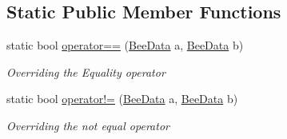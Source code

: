\subsection*{Static Public Member Functions}
\begin{DoxyCompactItemize}
\item 
static bool \hyperlink{struct_bee_game_1_1_bee_1_1_bee_data_aafcbf3edbd35377ba1ed6bd1597427f2}{operator==} (\hyperlink{struct_bee_game_1_1_bee_1_1_bee_data}{Bee\+Data} a, \hyperlink{struct_bee_game_1_1_bee_1_1_bee_data}{Bee\+Data} b)
\begin{DoxyCompactList}\small\item\em Overriding the Equality operator \end{DoxyCompactList}\item 
static bool \hyperlink{struct_bee_game_1_1_bee_1_1_bee_data_ae4242a16e9b9a05d7291dd819a651b46}{operator!=} (\hyperlink{struct_bee_game_1_1_bee_1_1_bee_data}{Bee\+Data} a, \hyperlink{struct_bee_game_1_1_bee_1_1_bee_data}{Bee\+Data} b)
\begin{DoxyCompactList}\small\item\em Overriding the not equal operator \end{DoxyCompactList}\end{DoxyCompactItemize}
